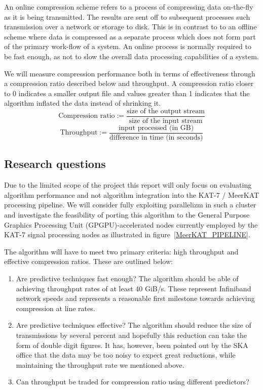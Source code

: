An online compression scheme refers to a process of compressing data on-the-fly as it is being transmitted. The results are sent off to subsequent 
processes such transmission over a network or storage to disk. This is in contrast to to an offline scheme where data is compressed as a separate process which does not
form part of the primary work-flow of a system. An online process is normally required to be fast enough, as not to slow the overall data processing capabilities of 
a system.

We will measure compression performance both in terms of effectiveness through a compression ratio described below \cite[p. 10]{salomon2004data} and throughput. A 
compression ratio closer to 0 indicates a smaller output file and values greater than 1 indicates that the algorithm inflated the data instead of shrinking it.
\begin{equation}
 \text{Compression ratio} := \frac{\text{size of the output stream}}{\text{size of the input stream}}
\end{equation}
\begin{equation}
 \text{Throughput} := \frac{\text{input processed (in GB)}}{\text{difference in time (in seconds)}}
\end{equation}
\subsection{Research questions}
Due to the limited scope of the project this report will only focus on evaluating algorithm performance and not algorithm integration into the KAT-7 / MeerKAT processing
pipeline. We will consider fully exploiting parallelizm in such a cluster and investigate the feasibility of porting this algorithm to the General Purpose Graphics Processing 
Unit (GPGPU)-accelerated nodes currently employed by the KAT-7 signal processing nodes as illustrated in figure~\ref{MeerKAT_PIPELINE}.

The algorithm will have to meet two primary criteria: high throughput and effective compression ratios. These are outlined below:
\begin{enumerate}
 \item Are predictive techniques fast enough? The algorithm should be able of achieving throughput rates of at least 40 GiB/s. These represent Infiniband network speeds 
 and represents a reasonable first milestone towards achieving compression at line rates.
 \item Are predictive techniques effective? The algorithm should reduce the size of transmissions by several percent and hopefully this reduction can take the form of 
       double digit figures. It has, however, been pointed out by the SKA office that the data may be too noisy to expect great reductions, while maintaining the throughput 
       rate we mentioned above.
 \item Can throughput be traded for compression ratio using different predictors?
\end{enumerate}

